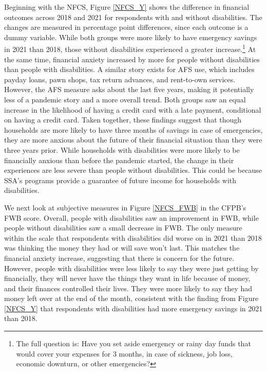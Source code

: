 \documentclass[12pt]{article}
\begin{document}
Beginning with the NFCS, Figure \ref{NFCS_Y} shows the difference in financial outcomes across 2018 and 2021 for respondents with and without disabilities. The changes are measured in percentage point differences, since each outcome is a dummy variable. While both groups were more likely to have emergency savings in 2021 than 2018, those without disabilities experienced a greater increase.\footnote{The full question is: Have you set aside emergency or rainy day funds that would cover your expenses for 3 months, in case of sickness, job loss, economic downturn, or other emergencies?} At the same time, financial anxiety increased by more for people without disabilities than people with disabilities. A similar story exists for AFS use, which includes payday loans, pawn shops, tax return advances, and rent-to-own services. However, the AFS measure asks about the last five years, making it potentially less of a pandemic story and a more overall trend. Both groups saw an equal increase in the likelihood of having a credit card with a late payment, conditional on having a credit card. Taken together, these findings suggest that though households are more likely to have three months of savings in case of emergencies, they are more  anxious about the future of their financial situation than they were three years prior. While households with disabilities were more likely to be financially anxious than before the pandemic started, the change in their experiences are less severe than people without disabilities. This could be because SSA's programs provide a guarantee of future income for households with disabilities. 

We next look at subjective measures in Figure \ref{NFCS_FWB} in the CFPB's FWB score. Overall, people with disabilities saw an improvement in FWB, while people without disabilities saw a small decrease in FWB. The only measure within the scale that respondents with disabilities did worse on in 2021 than 2018 was thinking the money they had or will save won't last. This matches the financial anxiety increase, suggesting that there is concern for the future. However, people with disabilities were less likely to say they were just getting by financially, they will never have the things they want in life because of money, and their finances controlled their lives. They were more likely to say they had money left over at the end of the month, consistent with the finding from Figure \ref{NFCS_Y} that respondents with disabilities had more emergency savings in 2021 than 2018. 
\end{document}
